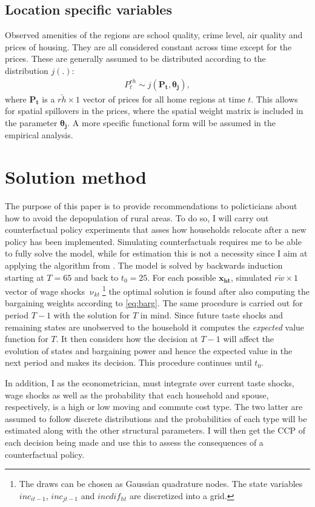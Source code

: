 \subsection{Location specific variables}
Observed amenities of the regions are school quality, crime level, air quality and prices of housing. They are all considered constant across time except for the prices. These are generally assumed to be distributed according to the distribution $j(.)$:
\begin{align*}
P^{rh}_t \sim j(\boldsymbol{P_{t}},\boldsymbol{\theta_j}),
\end{align*}
where $\boldsymbol{P_{t}}$ is a $\bar{rh}\times 1$ vector of prices for all home regions at time $t$. This allows for spatial spillovers in the prices, where the spatial weight matrix is included in the parameter $\boldsymbol{\theta_j}$. A more specific functional form will be assumed in the empirical analysis.

\section{Solution method}
The purpose of this paper is to provide recommendations to policticians about how to avoid the depopulation of rural areas. To do so, I will carry out counterfactual policy experiments that asses how households relocate after a new policy has been implemented. Simulating counterfactuals requires me to be able to fully solve the model, while for estimation this is not a necessity since I aim at applying the algorithm from \cite{ArcidiaconoMiller2011}. The model is solved by backwards induction starting at $T=65$ and back to $t_0=25$. For each possible $\boldsymbol{x_{ht}}$, simulated $\bar{rw}\times 1$ vector of wage shocks $\upnu_{kt}$\footnote{The draws can be chosen as Gaussian quadrature nodes. The state variables $inc_{it-1}$, $inc_{jt-1}$ and $incdif_{ht}$ are discretized into a grid.} the optimal solution is found after also computing the bargaining weights according to \eqref{eq:barg}. The same procedure is carried out for period $T-1$ with the solution for $T$ in mind. Since future taste shocks and remaining states are unobserved to the household it computes the \textit{expected} value function for $T$. It then considers how the decision at $T-1$ will affect the evolution of states and bargaining power and hence the expected value in the next period and makes its decision. This procedure continues until $t_0$.

In addition, I as the econometrician, must integrate over current taste shocks, wage shocks as well as the probability that each household and spouse, respectively, is a high or low moving and commute cost type. The two latter are assumed to follow discrete distributions and the probabilities of each type will be estimated along with the other structural parameters. I will then get the CCP of each decision being made and use this to assess the consequences of a counterfactual policy.




